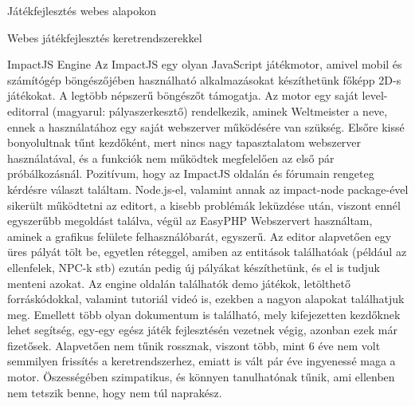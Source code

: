 \begin{MyChapter}{Játékfejlesztés webes alapokon}
\begin{MySection}{Webes játékfejlesztés keretrendszerekkel}
		\begin{MySubSection}{ImpactJS Engine}
			Az ImpactJS egy olyan JavaScript játékmotor, amivel mobil és számítógép böngészőjében használható alkalmazásokat készíthetünk főképp 2D-s játékokat. A legtöbb népszerű böngészőt támogatja.
			Az motor egy saját level-editorral (magyarul: pályaszerkesztő) rendelkezik, aminek Weltmeister a neve, ennek a használatához egy saját webszerver működésére van szükség. Elsőre kissé bonyolultnak tűnt kezdőként, mert nincs nagy tapasztalatom webszerver használatával, és a funkciók nem működtek megfelelően az első pár próbálkozásnál. Pozitívum, hogy az ImpactJS oldalán és fórumain rengeteg kérdésre választ találtam. Node.js-el, valamint annak az impact-node package-ével sikerült működtetni az editort, a kisebb problémák leküzdése után, viszont ennél egyszerűbb megoldást találva, végül az EasyPHP Webszervert használtam, aminek a grafikus felülete felhasználóbarát, egyszerű. Az editor alapvetően egy üres pályát tölt be, egyetlen réteggel, amiben az entitások találhatóak (például az ellenfelek, NPC-k stb) ezután pedig új pályákat készíthetünk, és el is tudjuk menteni azokat. Az engine oldalán találhatók demo játékok, letölthető forráskódokkal, valamint tutoriál videó is, ezekben a nagyon alapokat találhatjuk meg. Emellett több olyan dokumentum is található, mely kifejezetten kezdőknek lehet segítség, egy-egy egész játék fejlesztésén vezetnek végig, azonban ezek már fizetősek. Alapvetően nem tűnik rossznak, viszont több, mint 6 éve nem volt semmilyen frissítés a keretrendszerhez, emiatt is vált pár éve ingyenessé maga a motor. Öszességében szimpatikus, és könnyen tanulhatónak tűnik, ami ellenben nem tetszik benne, hogy nem túl naprakész.
		\end{MySubSection}
			

\end{MySection}
\end{MyChapter}
